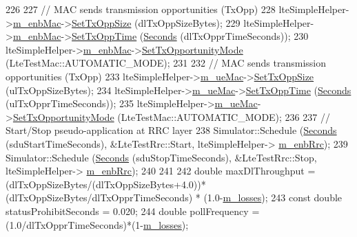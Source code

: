 \begin{DoxyCode}
226 
227   \textcolor{comment}{// MAC sends transmission opportunities (TxOpp)}
228   lteSimpleHelper->\hyperlink{classns3_1_1LteSimpleHelper_a953ff7bc15f6b310a13d35581c2fecef}{m\_enbMac}->\hyperlink{classns3_1_1LteTestMac_a650a080a34f7f31d97ec3a6daea651bb}{SetTxOppSize} (dlTxOppSizeBytes);
229   lteSimpleHelper->\hyperlink{classns3_1_1LteSimpleHelper_a953ff7bc15f6b310a13d35581c2fecef}{m\_enbMac}->\hyperlink{classns3_1_1LteTestMac_aeaa7f68b716b8ee044bd7af49f4ca141}{SetTxOppTime} (\hyperlink{group__timecivil_ga33c34b816f8ff6628e33d5c8e9713b9e}{Seconds} (dlTxOpprTimeSeconds));
230   lteSimpleHelper->\hyperlink{classns3_1_1LteSimpleHelper_a953ff7bc15f6b310a13d35581c2fecef}{m\_enbMac}->\hyperlink{classns3_1_1LteTestMac_af48f53304281f34d121eec2fecb85f6d}{SetTxOpportunityMode} (LteTestMac::AUTOMATIC\_MODE);
231 
232   \textcolor{comment}{// MAC sends transmission opportunities (TxOpp)}
233   lteSimpleHelper->\hyperlink{classns3_1_1LteSimpleHelper_a963987a7323f3f7b1cefbc0e0bc367bc}{m\_ueMac}->\hyperlink{classns3_1_1LteTestMac_a650a080a34f7f31d97ec3a6daea651bb}{SetTxOppSize} (ulTxOppSizeBytes);
234   lteSimpleHelper->\hyperlink{classns3_1_1LteSimpleHelper_a963987a7323f3f7b1cefbc0e0bc367bc}{m\_ueMac}->\hyperlink{classns3_1_1LteTestMac_aeaa7f68b716b8ee044bd7af49f4ca141}{SetTxOppTime} (\hyperlink{group__timecivil_ga33c34b816f8ff6628e33d5c8e9713b9e}{Seconds} (ulTxOpprTimeSeconds));
235   lteSimpleHelper->\hyperlink{classns3_1_1LteSimpleHelper_a963987a7323f3f7b1cefbc0e0bc367bc}{m\_ueMac}->\hyperlink{classns3_1_1LteTestMac_af48f53304281f34d121eec2fecb85f6d}{SetTxOpportunityMode} (LteTestMac::AUTOMATIC\_MODE);
236 
237   \textcolor{comment}{// Start/Stop pseudo-application at RRC layer}
238   Simulator::Schedule (\hyperlink{group__timecivil_ga33c34b816f8ff6628e33d5c8e9713b9e}{Seconds} (sduStartTimeSeconds), &LteTestRrc::Start, lteSimpleHelper->
      \hyperlink{classns3_1_1LteSimpleHelper_a89ce7ea3468b4cbea029490a6451052e}{m\_enbRrc});
239   Simulator::Schedule (\hyperlink{group__timecivil_ga33c34b816f8ff6628e33d5c8e9713b9e}{Seconds} (sduStopTimeSeconds), &LteTestRrc::Stop, lteSimpleHelper->
      \hyperlink{classns3_1_1LteSimpleHelper_a89ce7ea3468b4cbea029490a6451052e}{m\_enbRrc});
240 
241   
242   \textcolor{keywordtype}{double} maxDlThroughput = (dlTxOppSizeBytes/(dlTxOppSizeBytes+4.0))*(dlTxOppSizeBytes/dlTxOpprTimeSeconds)
       * (1.0-\hyperlink{classLteRlcAmE2eTestCase_afbb72ea6f3599c57b19be03be5e43878}{m\_losses});
243   \textcolor{keyword}{const} \textcolor{keywordtype}{double} statusProhibitSeconds = 0.020;
244   \textcolor{keywordtype}{double} pollFrequency = (1.0/dlTxOpprTimeSeconds)*(1-\hyperlink{classLteRlcAmE2eTestCase_afbb72ea6f3599c57b19be03be5e43878}{m\_losses});

\end{DoxyCode}
